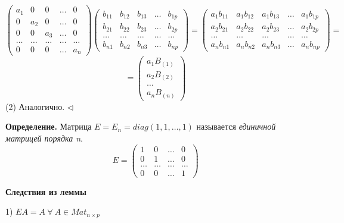 \begin{equation*}\begin{pmatrix} a_1 & 0 & 0 & \dots & 0 \\
0 & a_2 & 0 & \dots & 0 \\
0 & 0 & a_3 & \dots & 0 \\
\dots & \dots & \dots & \dots & \dots \\
0 & 0 & 0 & \dots & a_n 
\end{pmatrix} \begin{pmatrix} b_{11} & b_{12} & b_{13} & \dots & b_{1p} \\
b_{21} & b_{22} & b_{23} & \dots & b_{2p} \\
\dots & \dots & \dots & \dots & \dots \\
b_{n1} & b_{n2} & b_{n3} & \dots & b_{np}
\end{pmatrix} = \begin{pmatrix} a_1 b_{11} & a_1 b_{12} & a_1 b_{13} & \dots & a_1 b_{1p} \\
a_2 b_{21} & a_2 b_{22} & a_2 b_{23} & \dots & a_2 b_{2p} \\
\dots & \dots & \dots & \dots & \dots \\
a_n b_{n1} & a_n b_{n2} & a_n b_{n3} & \dots & a_n b_{np}
\end{pmatrix} = \end{equation*}
\begin{equation*} = \begin{pmatrix} a_1 B_{(1)} \\ a_2 B_{(2)} \\ \dots \\ a_n B_{(n)} \end{pmatrix} \end{equation*}
(2) Аналогично. $\lhd$

\bigskip
\textbf{Определение.} Матрица $E = E_n = diag(1, 1, \dots, 1)$ называется \textit{единичной матрицей порядка n}.
\begin{equation*} E = \begin{pmatrix} 1 & 0 & \dots & 0 \\ 
0 & 1 & \dots & 0 \\
\dots & \dots & \dots & \dots \\
0 & 0 & \dots & 1 
\end{pmatrix} \end{equation*}

\bigskip
\textbf{Следствия из леммы}

1) $EA = A \ \forall \ A \in Mat_{n \times p}$

